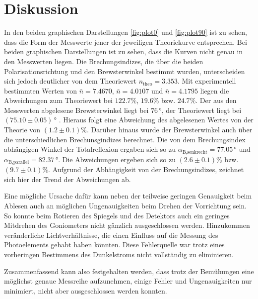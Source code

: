 \section{Diskussion}
\label{sec:Diskussion}

In den beiden graphischen Darstellungen \autoref{fig:plot0} und \autoref{fig:plot90} ist zu sehen, dass die Form der Messwerte jener der jeweiligen Theoriekurve entsprechen. Bei beiden graphischen Darstellungen ist zu sehen, dass die Kurven nicht genau in den Messwerten liegen.
Die Brechungsindizes, die über die beiden Polarisationsrichtung und den Brewsterwinkel bestimmt wurden, unterscheiden sich jedoch deutlicher von dem Theoriewert $n_{\text{theo}}=3.353$. Mit
experimentell bestimmten Werten von $\bar{n}=7.4670$, $\bar{n}= 4.0107$ und $\bar{n}= 4.1795$ liegen die Abweichungen zum Theoriewert bei $122.7\%$,  $19.6\%$ bzw. $24.7\%$. 
Der aus den Messwerten abgelesene Brewsterwinkel liegt bei $76\, °$, der Theoriewert liegt bei $(75.10 \pm 0.05)\, °$ \cite{Brewsterwinkel}. Hieraus folgt eine Abweichung des abgelesenen Wertes von der Theorie von $(1.2 \pm 0.1)\%$.
Darüber hinaus wurde der Brewsterwinkel auch über die unterschiedlichen Brechunsgindizes berechnet. Die von dem Brechungsindex abhängigen Winkel der Totalreflexion ergaben sich so zu $\alpha_{\text{B,senkrecht}}=77.05\, °$ und $\alpha_{\text{B,parallel}}=82.37\, °$.
Die Abweichungen ergeben sich so zu $(2.6 \pm 0.1)\%$ bzw. $(9.7 \pm 0.1)\%$. Aufgrund der Abhängigkeit von der Brechungsindizes, zeichnet sich hier der Trend der Abweichungen ab.

Eine mögliche Ursache dafür kann neben der teilweise geringen
Genauigkeit beim Ablesen auch an möglichen Ungenauigkeiten beim Drehen der Vorrichtung sein. So konnte beim Rotieren des Spiegels und des Detektors auch ein geringes Mitdrehen des Goniometers nicht gänzlich ausgeschlossen werden.
Hinzukommen veränderliche Lichtverhältnisse, die einen Einfluss auf die Messung des Photoelements gehabt haben könnten. Diese Fehlerquelle war trotz eines vorheringen Bestimmens des Dunkelstroms nicht vollständig zu eliminieren.

Zusammenfassend kann also festgehalten werden, dass trotz der Bemühungen eine möglichst genaue Messreihe aufzunehmen, einige Fehler und Ungenauigkeiten nur minimiert, nicht aber ausgeschlossen werden konnten.